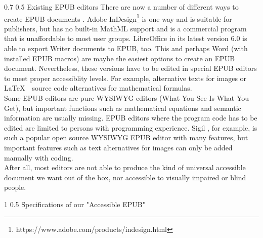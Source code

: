 \documentclass{llncs}
\makeatletter
\renewcommand\section{\@startsection 
   {section}{1}{0mm}%
   {1\baselineskip}%
   {0.5\baselineskip}%
   {\bfseries\Large}%
   }
\renewcommand\subsection{\@startsection 
   {subsection}{2}{0mm}%
   {0.7\baselineskip}%
   {0.5\baselineskip}%
   {\bfseries\large}%
   }
\makeatother
\begin{document}
\subsection{Existing EPUB editors}
\label{ch:exEPUB}
There are now a number of different ways to create EPUB documents \cite{EPUBprograms}. Adobe InDesign\footnote{https://www.adobe.com/products/indesign.html} is one way and is suitable for publishers, but has no built-in MathML support and is a commercial program that is unaffordable to most user groups. LibreOffice in its latest version 6.0 is able to export Writer documents to EPUB, too. This and perhaps Word (with installed EPUB macros) are maybe the easiest options to create an EPUB document. Nevertheless, these versions have to be edited in special EPUB editors to meet proper accessiblity levels. For example, alternative texts for images or \LaTeX $\mbox{ }$ source code alternatives for mathematical formulas.\\
Some EPUB editors are pure WYSIWYG editors (What You See Is What You Get), but important functions such as mathematical equations and semantic information are usually missing. EPUB editors where the program code has to be edited are limited to persons with programming experience. Sigil \cite{Sigil}, for example, is such a popular open source WYSIWYG EPUB editor with many features, but important features such as text alternatives for images can only be added manually with coding.\\
After all, most editors are not able to produce the kind of universal accessible document we want out of the box, nor accessible to visually impaired or blind people. 

\section{Specifications of our "Accessible EPUB"}
\end{document}
